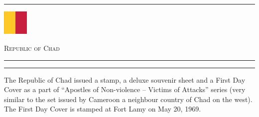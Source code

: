 \documentclass[a4paper]{article}
\begin{document}
\hrule
\vspace{8pt}
\begin{minipage}{2cm}
  \includegraphics[height=1.2cm]{images/td}
\end{minipage}
\hfill
{\scshape\huge Republic of Chad}
\vspace{8pt}
\hrule
\vspace{14cm}
\hfill
\begin{minipage}{6cm}
  \hrule \vspace{12pt} The Republic of Chad issued a stamp, a deluxe
  souvenir sheet and a First Day Cover as a part of ``Apostles of
  Non-violence -- Victims of Attacks'' series (very similar to the set
  issued by Cameroon a neighbour country of Chad on the west). The
  First Day Cover is stamped at Fort Lamy on May 20, 1969.
\end{minipage}

\end{document}
